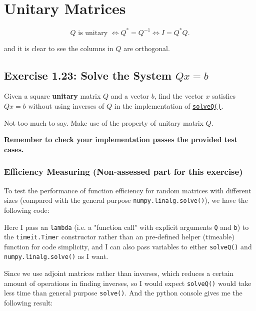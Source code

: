 \section{Unitary Matrices}%
\begin{definition}
  \[
  Q \text{ is unitary } \iff Q^{*} = Q^{-1} \iff I = Q^{*}Q 
  .\] 
\end{definition}
and it is clear to see the columns in \(Q\) are orthogonal.
\subsection*{Exercise 1.23: Solve the System $Qx=b$}
\begin{problem}
  Given a square \textbf{unitary} matrix $Q$ and a vector $b$, find the vector $x$ satisfies $Qx = b$ without using inverses of $Q$ in the implementation of \href{https://comp-lin-alg.github.io/cla_utils.html#cla_utils.exercises2.solveQ}{\texttt{solveQ()}}.
\end{problem}
\begin{hint}
  Not too much to say. Make use of the property of unitary matrix \(Q\).
\end{hint}
\noindent \textbf{Remember to check your implementation passes the provided test cases.}

\subsubsection*{Efficiency Measuring (Non-assessed part for this exercise)}%
To test the performance of function efficiency for random matrices with different sizes (compared with the general purpose \texttt{numpy.linalg.solve()}), we have the following code:

Here I pass an \texttt{lambda} (i.e. a "function call" with explicit arguments \texttt{Q} and \texttt{b}) to the \texttt{timeit.Timer} constructor rather than an pre-defined helper (timeable) function for code simplicity, and I can also pass variables to either \texttt{solveQ()} and \texttt{numpy.linalg.solve()} as I want.

\medskip
\noindent Since we use adjoint matrices rather than inverses, which reduces a certain amount of operations in finding inverses, so I would expect \texttt{solveQ()} would take less time than general purpose \texttt{solve()}. And the python console gives me the following result:

